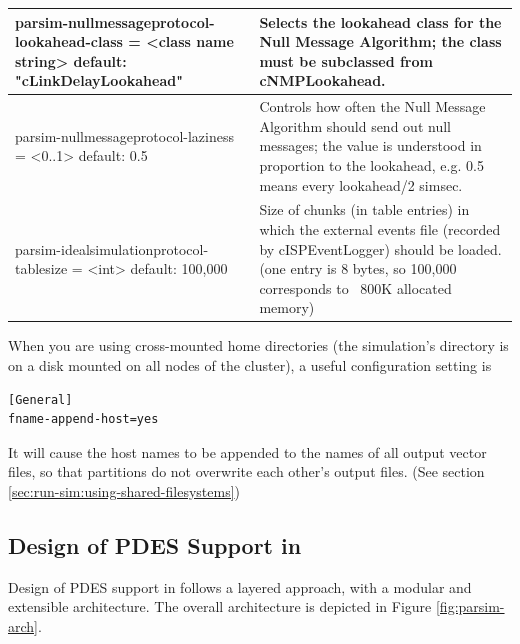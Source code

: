 \begin{longtable}{|p{6.5cm}|p{7.5cm}|}
parsim-nullmessageprotocol-lookahead-class = <class name string>\linebreak
default: "cLinkDelayLookahead"
&
Selects the lookahead class for the Null Message Algorithm; the
class must be subclassed from cNMPLookahead.
\\\hline

parsim-nullmessageprotocol-laziness = <0..1>\linebreak
default: 0.5
&
Controls how often the Null Message Algorithm should send out null
messages; the value is understood in proportion to the lookahead,
e.g. 0.5 means every lookahead/2 simsec.
\\\hline

parsim-idealsimulationprotocol-tablesize = <int>\linebreak
default: 100,000
&
Size of chunks (in table entries) in which the external events
file (recorded by cISPEventLogger) should be loaded.
(one entry is 8 bytes, so 100,000 corresponds to ~800K allocated
memory)

\end{longtable}




When you are using cross-mounted home directories (the simulation's
directory is on a disk mounted on all nodes of the cluster),
a useful configuration setting is

\begin{verbatim}
[General]
fname-append-host=yes
\end{verbatim}

It will cause the host names to be appended to the names of
all output vector files, so that partitions do not overwrite each other's
output files. (See section \ref{sec:run-sim:using-shared-filesystems})





\subsection{Design of PDES Support in {\opp}}

Design of PDES support in {\opp} follows a layered approach,
with a modular and extensible architecture. The overall
architecture is depicted in Figure \ref{fig:parsim-arch}.

